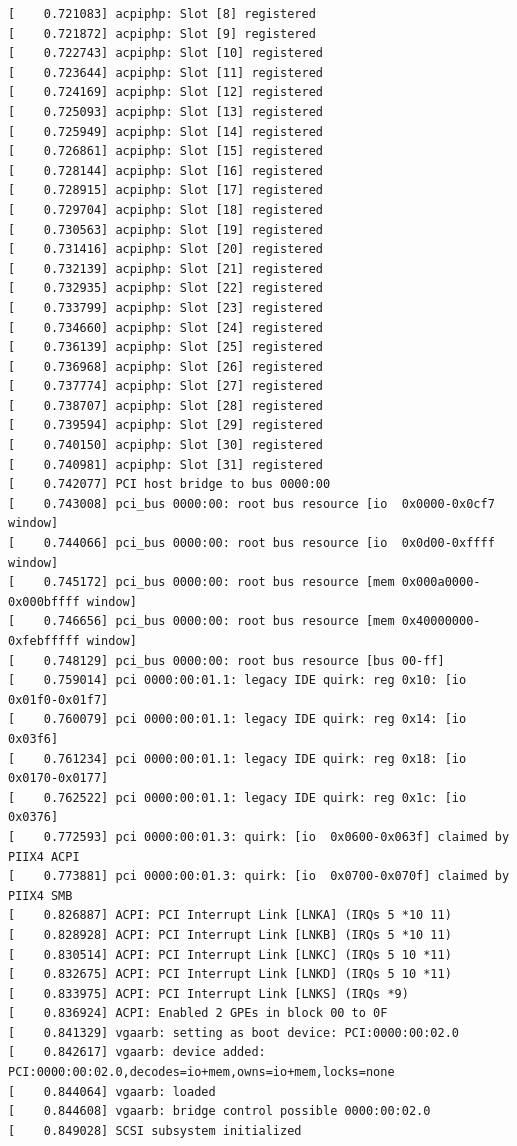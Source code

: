 \documentclass[12pt]{article}
\begin{document}
\begin{verbatim}
[    0.721083] acpiphp: Slot [8] registered
[    0.721872] acpiphp: Slot [9] registered
[    0.722743] acpiphp: Slot [10] registered
[    0.723644] acpiphp: Slot [11] registered
[    0.724169] acpiphp: Slot [12] registered
[    0.725093] acpiphp: Slot [13] registered
[    0.725949] acpiphp: Slot [14] registered
[    0.726861] acpiphp: Slot [15] registered
[    0.728144] acpiphp: Slot [16] registered
[    0.728915] acpiphp: Slot [17] registered
[    0.729704] acpiphp: Slot [18] registered
[    0.730563] acpiphp: Slot [19] registered
[    0.731416] acpiphp: Slot [20] registered
[    0.732139] acpiphp: Slot [21] registered
[    0.732935] acpiphp: Slot [22] registered
[    0.733799] acpiphp: Slot [23] registered
[    0.734660] acpiphp: Slot [24] registered
[    0.736139] acpiphp: Slot [25] registered
[    0.736968] acpiphp: Slot [26] registered
[    0.737774] acpiphp: Slot [27] registered
[    0.738707] acpiphp: Slot [28] registered
[    0.739594] acpiphp: Slot [29] registered
[    0.740150] acpiphp: Slot [30] registered
[    0.740981] acpiphp: Slot [31] registered
[    0.742077] PCI host bridge to bus 0000:00
[    0.743008] pci_bus 0000:00: root bus resource [io  0x0000-0x0cf7 window]
[    0.744066] pci_bus 0000:00: root bus resource [io  0x0d00-0xffff window]
[    0.745172] pci_bus 0000:00: root bus resource [mem 0x000a0000-0x000bffff window]
[    0.746656] pci_bus 0000:00: root bus resource [mem 0x40000000-0xfebfffff window]
[    0.748129] pci_bus 0000:00: root bus resource [bus 00-ff]
[    0.759014] pci 0000:00:01.1: legacy IDE quirk: reg 0x10: [io  0x01f0-0x01f7]
[    0.760079] pci 0000:00:01.1: legacy IDE quirk: reg 0x14: [io  0x03f6]
[    0.761234] pci 0000:00:01.1: legacy IDE quirk: reg 0x18: [io  0x0170-0x0177]
[    0.762522] pci 0000:00:01.1: legacy IDE quirk: reg 0x1c: [io  0x0376]
[    0.772593] pci 0000:00:01.3: quirk: [io  0x0600-0x063f] claimed by PIIX4 ACPI
[    0.773881] pci 0000:00:01.3: quirk: [io  0x0700-0x070f] claimed by PIIX4 SMB
[    0.826887] ACPI: PCI Interrupt Link [LNKA] (IRQs 5 *10 11)
[    0.828928] ACPI: PCI Interrupt Link [LNKB] (IRQs 5 *10 11)
[    0.830514] ACPI: PCI Interrupt Link [LNKC] (IRQs 5 10 *11)
[    0.832675] ACPI: PCI Interrupt Link [LNKD] (IRQs 5 10 *11)
[    0.833975] ACPI: PCI Interrupt Link [LNKS] (IRQs *9)
[    0.836924] ACPI: Enabled 2 GPEs in block 00 to 0F
[    0.841329] vgaarb: setting as boot device: PCI:0000:00:02.0
[    0.842617] vgaarb: device added: PCI:0000:00:02.0,decodes=io+mem,owns=io+mem,locks=none
[    0.844064] vgaarb: loaded
[    0.844608] vgaarb: bridge control possible 0000:00:02.0
[    0.849028] SCSI subsystem initialized

\end{verbatim}
\end{document}
